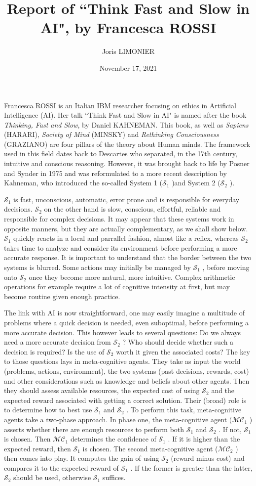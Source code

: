 \documentclass{article}
\title{Report of ``Think Fast and Slow in AI", by Francesca ROSSI}
\author{Joris LIMONIER}
\date{November 17, 2021}
\newcommand{\so}{\ensuremath{\mathcal{S}_1} }
\newcommand{\st}{\ensuremath{\mathcal{S}_2} }
\newcommand{\mco}{\ensuremath{\mathcal{MC}_1} }
\newcommand{\mct}{\ensuremath{\mathcal{MC}_2} }
\begin{document}
\maketitle
{}
\vspace{.5cm}
Francesca ROSSI is an Italian IBM researcher focusing on ethics in Artificial Intelligence (AI). Her talk ``Think Fast and Slow in AI" is named after the book \textit{Thinking, Fast and Slow}, by Daniel KAHNEMAN. This book, as well as \textit{Sapiens} (HARARI), \textit{Society of Mind} (MINSKY) and \textit{Rethinking Consciousness} (GRAZIANO) are four pillars of the theory about Human minds. The framework used in this field dates back to Descartes who separated, in the 17th century, intuitive and conscious reasoning. However, it was brought back to life by Posner and Synder in 1975 and was reformulated to a more recent description by Kahneman, who introduced the so-called System 1 (\so)and System 2 (\st).

\so is fast, unconscious, automatic, error prone and is responsible for everyday decisions. \st on the other hand is slow, conscious, effortful, reliable and responsible for complex decisions. It may appear that these systems work in opposite manners, but they are actually complementary, as we shall show below. \so quickly reacts in a local and parrallel fashion, almost like a reflex, whereas \st takes time to analyze and consider its environment before performing a more accurate response. It is important to understand that the border between the two systems is blurred. Some actions may initially be managed by \so, before moving onto \st once they become more natural, more intuitive. Complex arithmetic operations for example require a lot of cognitive intensity at first, but may become routine given enough practice.

The link with AI is now straightforward, one may easily imagine a multitude of problems where a quick decision is needed, even suboptimal, before performing a more accurate decision. This however leads to several questions: Do we always need a more accurate decision from \st? Who should decide whether such a decision is required? Is the use of \st worth it given the associated costs? The key to those questions lays in meta-cognitive agents. They take as input the world (problems, actions, environment), the two systems (past decisions, rewards, cost) and other considerations such as knowledge and beliefs about other agents. Then they should assess available resources, the expected cost of using \st and the expected reward associated with getting a correct solution. Their (broad) role is to determine how to best use \so and \st. To perform this task, meta-cognitive agents take a two-phase approach. In phase one, the meta-cognitive agent (\mco) asserts whether there are enough resources to perform both \so and \st. If not, \so is chosen. Then \mco determines the confidence of \so. If it is higher than the expected reward, then \so is chosen. The second meta-cognitive agent (\mct) then comes into play. It computes the gain of using \st (reward minus cost) and compares it to the expected reward of \so. If the former is greater than the latter, \st should be used, otherwise \so suffices.
\end{document}
